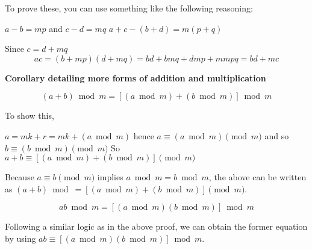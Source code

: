 To prove these, you can use something like the following reasoning:

$a - b = mp$ and $c - d = mq$
$a + c - (b + d) = m(p+q)$

Since $c = d + mq$
$$
ac = (b + mp)(d + mq) = bd + bmq + dmp + mmpq = bd + mc
$$

\textbf{Corollary detailing more forms of addition and multiplication}

\begin{equation}
    (a+b) \bmod m = [(a \bmod m) + (b \bmod m)] \bmod m
\end{equation}

To show this,

$a = mk + r = mk + (a \bmod m)$ hence
$a \equiv (a \bmod m) \pmod m$ and so $b \equiv (b \bmod m) \pmod m$
So $a + b \equiv [(a \bmod m) + (b \bmod m)] \pmod m$

Because $a \equiv b \pmod m$ implies $a \bmod m = b \bmod m$, the above can be written as
$(a+b) \bmod = [(a \bmod m) + (b \bmod m)] \pmod m$.

\begin{equation}
    ab \bmod m = [(a \bmod m)(b \bmod m)] \bmod m
\end{equation}

Following a similar logic as in the above proof, we can obtain the former equation by using $ab \equiv [(a \bmod m)(b \bmod m)] \bmod m$.
